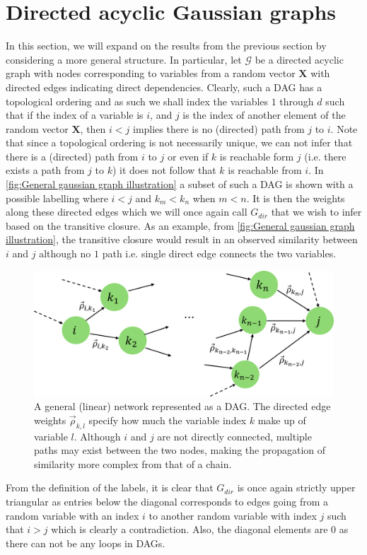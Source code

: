 \documentclass[../Thesis.tex]{subfiles}
\begin{document}
\newpage
\section{Directed acyclic Gaussian graphs}\label{sec:General Gaussian graph}
In this section, we will expand on the results from the previous section by considering a more general structure. In particular, let $\mathcal{G}$ be a directed acyclic graph with nodes corresponding to variables from a random vector $\boldsymbol X$ with directed edges indicating direct dependencies. Clearly, such a DAG has a topological ordering and as such we shall index the variables $1$ through $d$ such that if the index of a variable is $i$, and $j$ is the index of another element of the random vector $\boldsymbol X$, then $i < j$ implies there is no (directed) path from $j$ to $i$. Note that since a topological ordering is not necessarily unique, we can not infer that there is a (directed) path from $i$ to $j$ or even if $k$ is reachable form $j$ (i.e. there exists a path from $j$ to $k$) it does not follow that $k$ is reachable from $i$. In \autoref{fig:General gaussian graph illustration} a subset of such a DAG is shown with a possible labelling where $i < j$ and $k_m < k_n$ when $m < n$. It is then the weights along these directed edges which we will once again call $G_{dir}$ that we wish to infer based on the transitive closure. As an example, from \autoref{fig:General gaussian graph illustration}, the transitive closure would result in an observed similarity between $i$ and $j$ although no $1$ path i.e. single direct edge connects the two variables.
\begin{figure}[h]
    \centering
    \includegraphics[width = .7\linewidth]{figures/ND examples/Gaussian graph illustration.png}
    \caption{A general (linear) network represented as a DAG. The directed edge weights $\vec{\rho}_{k,l}$ specify how much the variable index $k$ make up of variable $l$. Although $i$ and $j$ are not directly connected, multiple paths may exist between the two nodes, making the propagation of similarity more complex from that of a chain.}
    \label{fig:General gaussian graph illustration}
\end{figure}
From the definition of the labels, it is clear that $G_{dir}$ is once again strictly upper triangular as entries below the diagonal corresponds to edges going from a random variable with an index $i$ to another random variable with index $j$ such that $i > j$ which is clearly a contradiction. Also, the diagonal elements are $0$ as there can not be any loops in DAGs.
\end{document}
